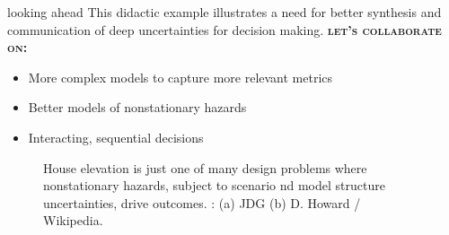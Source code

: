 \begin{block}{looking ahead}
    This didactic example illustrates a need for better synthesis and communication of deep uncertainties for decision making.
    \textbf{\scshape let's collaborate on:}
    \begin{itemize}
        \item More complex models to capture more relevant metrics
        \item Better models of nonstationary hazards
        \item Interacting, sequential decisions
    \end{itemize}
    \begin{framed}
        \begin{figure}
            \centering
            \hfill
            \caption{
                House elevation is just one of many design problems where nonstationary hazards, subject to scenario nd model structure uncertainties, drive outcomes.
                : (a) JDG (b) D. Howard / Wikipedia.
            }
            \label{fig:stormwater-bridge}
        \end{figure}
    \end{framed}
\end{block}